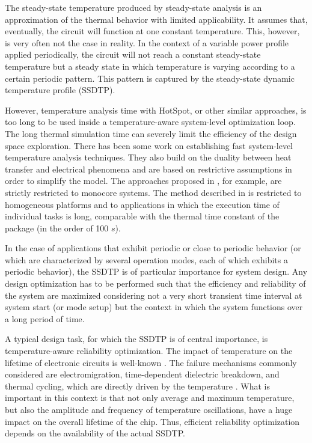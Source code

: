 The steady-state temperature produced by steady-state analysis is an
approximation of the thermal behavior with limited applicability. It assumes
that, eventually, the circuit will function at one constant temperature.  This,
however, is very often not the case in reality. In the context of a variable
power profile applied periodically, the circuit will not reach a constant
steady-state temperature but a steady state in which temperature is varying
according to a certain periodic pattern. This pattern is captured by the
steady-state dynamic temperature profile (SSDTP).

However, temperature analysis time with HotSpot, or other similar approaches, is
too long to be used inside a temperature-aware system-level optimization loop.
The long thermal simulation time can severely limit the efficiency of the design
space exploration. There has been some work on establishing fast system-level
temperature analysis techniques. They also build on the duality between heat
transfer and electrical phenomena and are based on restrictive assumptions in
order to simplify the model. The approaches proposed in \cite{rai2011, bao2010},
for example, are strictly restricted to monocore systems. The method described
in \cite{rao2009} is restricted to homogeneous platforms and to applications in
which the execution time of individual tasks is long, comparable with the
thermal time constant of the package (in the order of 100 $s$).

In the case of applications that exhibit periodic or close to periodic behavior
(or which are characterized by several operation modes, each of which exhibits a
periodic behavior), the SSDTP is of particular importance for system design. Any
design optimization has to be performed such that the efficiency and reliability
of the system are maximized considering not a very short transient time interval
at system start (or mode setup) but the context in which the system functions
over a long period of time.

A typical design task, for which the SSDTP is of central importance, is
temperature-aware reliability optimization. The impact of temperature on the
lifetime of electronic circuits is well-known \cite{srinivasan2004, coskun2006,
xiang2010, jedec2010}. The failure mechanisms commonly considered are
electromigration, time-dependent dielectric breakdown, and thermal cycling,
which are directly driven by the temperature \cite{jedec2010}. What is important
in this context is that not only average and maximum temperature, but also the
amplitude and frequency of temperature oscillations, have a huge impact on the
overall lifetime of the chip. Thus, efficient reliability optimization depends
on the availability of the actual SSDTP.

